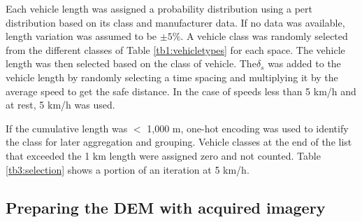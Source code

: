 Each vehicle length was assigned a probability distribution using a pert distribution based on its class and manufacturer data.  If no data was available, length variation was assumed to be $\pm5\%$. A vehicle class was randomly selected from the different classes of Table \ref{tb1:vehicletypes} for each space.  The vehicle length was then selected based on the class of vehicle.  The$\delta_{s}$ was added to the vehicle length by randomly selecting a time spacing and multiplying it by the average speed to get the safe distance. In the case of speeds less than 5 km/h and at rest, 5 km/h was used.  

If the cumulative length was $<$ 1,000 m, one-hot encoding was used to identify the class for later aggregation and grouping.  Vehicle classes at the end of the list that exceeded the 1 km length were assigned zero and not counted.  Table \ref{tb3:selection} shows a portion of an iteration at 5 km/h. 

\begin{table}[H]
\centering
\caption[Vehicle density sample]{Sample of an iteration showing vehicle class and road space selection for speed = 5 km/h.}
\label{tb3:selection}
\end{table}

\subsection{Preparing the DEM with acquired imagery}

